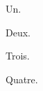 \begin{example}
  \begin{remark} Un. \end{remark}
  \begin{remark} Deux. \end{remark}
  \begin{remark} Trois. \end{remark}
  \begin{remark} Quatre. \end{remark}
\end{example}
